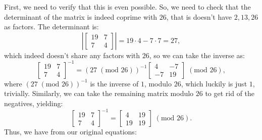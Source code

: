 \documentclass{article}
\begin{document}
\noindent First, we need to verify that this is even possible. So, we need to check that the determinant of the matrix is indeed coprime with $26$, that is doesn't have $2, 13, 26$ as factors. The determinant is:
\[
    \left|\begin{bmatrix}
        19 & 7 \\
        7 & 4
    \end{bmatrix}\right| = 19 \cdot 4 - 7 \cdot 7 = 27,
\]
which indeed doesn't share any factors with $26$, so we can take the inverse as:
\[
    \begin{bmatrix}
        19 & 7 \\
        7 & 4
    \end{bmatrix}^{-1} = (27 \; (\text{mod } 26))^{-1} \begin{bmatrix}
        4 & -7 \\
        -7 & 19
    \end{bmatrix} \; (\text{mod } 26),
\]
where $(27 \; (\text{mod } 26))^{-1}$ is the inverse of $1$, modulo $26$, which luckily is just $1$, trivially. Similarly, we can take the remaining matrix modulo $26$ to get rid of the negatives, yielding:
\[
    \begin{bmatrix}
        19 & 7 \\
        7 & 4
    \end{bmatrix}^{-1} = \begin{bmatrix}
        4 & 19 \\
        19 & 19
    \end{bmatrix} \; (\text{mod } 26).
\]
Thus, we have from our original equations:
\end{document}
